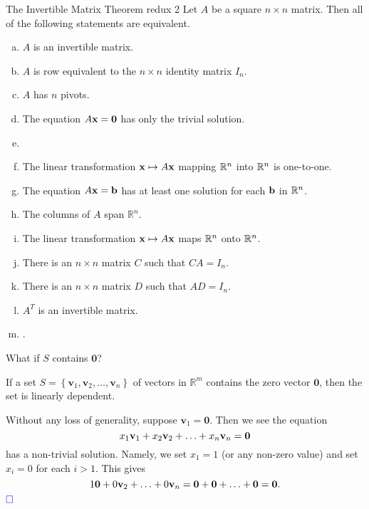 \documentclass[xcolor=dvipsnames,aspectratio=169,t]{beamer}
\begin{document}
\begin{frame}{The Invertible Matrix Theorem redux 2}
  Let $A$ be a square $n \times n$ matrix. Then all of the following statements are \alert{equivalent}.
  
  \begin{enumerate}[(a)]
    \item \alert{$A$ is an invertible matrix.}
    \item $A$ is row equivalent to the $n \times n$ identity matrix $I_n$.
    \item $A$ has $n$ pivots.
    \item The equation $A\mathbf{x}=\mathbf{0}$ has only the trivial solution.
    \item {}
    \item The linear transformation $\mathbf{x}\mapsto A\mathbf{x}$ mapping $\mathbb{R}^n$ into $\mathbb{R}^n$ is one-to-one.
    \item The equation $A\mathbf{x}=\mathbf{b}$ has at least one solution for each $\mathbf{b}$ in $\mathbb{R}^n$.
    \item The columns of $A$ span $\mathbb{R}^n$.
    \item The linear transformation $\mathbf{x} \mapsto A\mathbf{x}$ maps $\mathbb{R}^n$ onto $\mathbb{R}^n$.
    \item There is an $n \times n$ matrix $C$ such that $CA = I_n$.
    \item There is an $n \times n$ matrix $D$ such that $AD = I_n$.
    \item $A^T$ is an invertible matrix.
    \item {}.
  \end{enumerate}
\end{frame}


\begin{frame}{What if $S$ contains $\mathbf{0}$?}

  \begin{theorem}
    If a set $S = \left\{ \mathbf{v}_1 ,  \mathbf{v}_2, \ldots ,  \mathbf{v}_n \right\}$ of vectors in $\mathbb{R}^m$ contains the \alert{zero vector $\mathbf{0}$}, then the set is linearly dependent.
  \end{theorem}
  \medskip

  \pause
  
  Without any loss of generality, suppose $\mathbf{v}_1 = \mathbf{0}$. Then we see the equation
    \[\displaystyle x_1  \mathbf{v}_1 + x_2  \mathbf{v}_2  + \ldots + x_n  \mathbf{v}_n = \mathbf{0}\]
    has a non-trivial solution. 
    Namely, we set $x_1 = 1$ (or any non-zero value) and set $x_i=0$ for each $i>1$.  This gives
    \[\displaystyle 1  \mathbf{0} + 0  \mathbf{v}_2  + \ldots + 0 \mathbf{v}_n =  \mathbf{0} +  \mathbf{0} + \ldots +  \mathbf{0}  =  \mathbf{0} .\]
    \hfill $\textcolor{blue}{\square}$
\end{frame}
\end{document}
